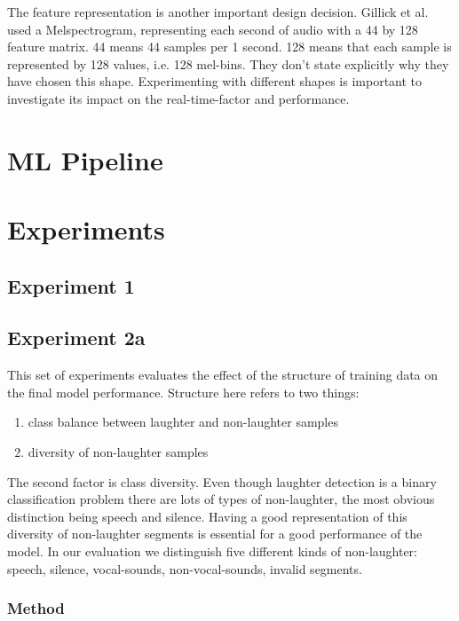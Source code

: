 \documentclass[bsc,frontabs,parskip,deptreport]{infthesis}
\begin{document}
The feature representation is another important design decision. Gillick et al. \citep{gillick2021robust} used a Melspectrogram, representing each second of audio with a 44 by 128 feature matrix. 44 means 44 samples per 1 second. 128 means that each sample is represented by 128 values, i.e. 128 mel-bins. They don't state explicitly why they have chosen this shape. 
Experimenting with different shapes is important to investigate its impact on the real-time-factor and performance.  

\chapter{ML Pipeline}



\chapter{Experiments} \label{cha:experiments}

\section{Experiment 1}

\section{Experiment 2a} \label{exp:2}
This set of experiments evaluates the effect of the structure of training data on the final model performance. Structure here refers to two things: 
\begin{enumerate}
    \item class balance between laughter and non-laughter samples
    \item diversity of non-laughter samples 
\end{enumerate}


The second factor is class diversity. Even though laughter detection is a binary classification problem there are lots of types of non-laughter, the most obvious distinction being speech and silence. Having a good representation of this diversity of non-laughter segments is essential for a good performance of the model.
In our evaluation we distinguish five different kinds of non-laughter:
speech, silence, vocal-sounds, non-vocal-sounds, invalid segments. 

\subsection{Method}
\end{document}
